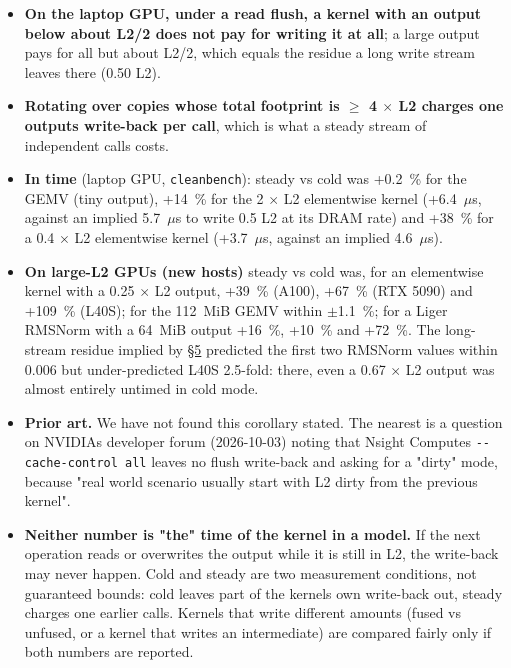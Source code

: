 \documentclass[11pt,a4paper]{article}
\providecommand{\tightlist}{\setlength{\itemsep}{0pt}\setlength{\parskip}{0pt}}
\begin{document}
\begin{itemize}
\tightlist
\item
  \textbf{On the laptop GPU, under a read flush, a kernel with an output below about L2/2 does not pay for writing it at
  all}; a large output pays for all but about L2/2, which equals the residue a long write stream leaves there
  (0.50 L2).
\item
  \textbf{Rotating over copies whose total footprint is \ensuremath{\ge} 4 \ensuremath{\times} L2 charges one output\textquotesingle s write-back per call}, which is
  what a steady stream of independent calls costs.
\item
  \textbf{In time} (laptop GPU, \texttt{cleanbench}): steady vs cold was +0.2~\% for the GEMV (tiny output), +14~\% for the
  2 \ensuremath{\times} L2 elementwise kernel (+6.4~\ensuremath{\mu}s, against an implied 5.7~\ensuremath{\mu}s to write 0.5 L2 at its DRAM rate) and +38~\% for a
  0.4 \ensuremath{\times} L2 elementwise kernel (+3.7~\ensuremath{\mu}s, against an implied 4.6~\ensuremath{\mu}s).
\item
  \textbf{On large-L2 GPUs (new hosts)} steady vs cold was, for an elementwise kernel with a 0.25 \ensuremath{\times} L2 output, +39~\%
  (A100), +67~\% (RTX 5090) and +109~\% (L40S); for the 112~MiB GEMV within \ensuremath{\pm}1.1~\%; for a Liger RMSNorm with a
  64~MiB output +16~\%, +10~\% and +72~\%. The long-stream residue implied by \hyperref[how-big-is-the-bias-nine-gpus]{\S{}5} predicted the first two RMSNorm
  values within 0.006 but under-predicted L40S 2.5-fold: there, even a 0.67 \ensuremath{\times} L2 output was almost entirely
  untimed in cold mode.
\item
  \textbf{Prior art.} We have not found this corollary stated. The nearest is a question on NVIDIA\textquotesingle s developer forum
  (2026-10-03) noting that Nsight Compute\textquotesingle s \texttt{-\/-cache-control\ all} leaves no flush write-back and asking for a
  "dirty" mode, because "real world scenario usually start with L2 dirty from the previous kernel".
\item
  \textbf{Neither number is "the" time of the kernel in a model.} If the next operation reads or overwrites the output
  while it is still in L2, the write-back may never happen. Cold and steady are two measurement conditions, not
  guaranteed bounds: cold leaves part of the kernel\textquotesingle s own write-back out, steady charges one earlier call\textquotesingle s. Kernels that write different amounts (fused vs unfused, or a kernel
  that writes an intermediate) are compared fairly only if both numbers are reported.
\end{itemize}
\end{document}
